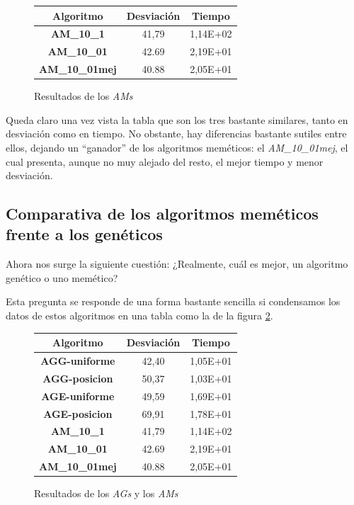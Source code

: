 \begin{figure}[H]
    \centering
    \begin{tabular}{|c|c|c|}
        \hline
        Algoritmo & \textbf{Desviación} & \textbf{Tiempo}\\
        \hline
        \textbf{AM\_10\_1} & 41,79 & 1,14E+02\\
        \hline
        \textbf{AM\_10\_01} & 42.69 & 2,19E+01\\
        \hline
        \textbf{AM\_10\_01mej} & 40.88 & 2,05E+01\\
        \hline
    \end{tabular}
    \caption{Resultados de los \textit{AMs}}
    \label{fig:tablamem}
\end{figure}

Queda claro una vez vista la tabla que son los tres bastante similares, tanto en desviación como en tiempo.
No obstante, hay diferencias bastante sutiles entre ellos, dejando un ``ganador'' de los algoritmos meméticos: el \textit{AM\_10\_01mej}, el cual presenta, aunque no muy alejado del resto, el mejor tiempo y menor desviación.

\subsection{Comparativa de los algoritmos meméticos frente a los genéticos}

Ahora nos surge la siguiente cuestión: ¿Realmente, cuál es mejor, un algoritmo genético o uno memético?

Esta pregunta se responde de una forma bastante sencilla si condensamos los datos de estos algoritmos en una tabla como la de la figura \ref{fig:memvsgen}.

\begin{figure}[H]
    \centering
    \begin{tabular}{|c|c|c|}
        \hline
        Algoritmo & \textbf{Desviación} & \textbf{Tiempo}\\
        \hline
        \textbf{AGG-uniforme} & 42,40 & 1,05E+01\\
        \hline
        \textbf{AGG-posicion} & 50,37 & 1,03E+01\\
        \hline
        \textbf{AGE-uniforme} & 49,59 & 1,69E+01\\
        \hline
        \textbf{AGE-posicion} & 69,91 & 1,78E+01\\
        \hline
        \textbf{AM\_10\_1} & 41,79 & 1,14E+02\\
        \hline
        \textbf{AM\_10\_01} & 42.69 & 2,19E+01\\
        \hline
        \textbf{AM\_10\_01mej} & 40.88 & 2,05E+01\\
        \hline
    \end{tabular}
    \caption{Resultados de los \textit{AGs} y los \textit{AMs}}
    \label{fig:memvsgen}
\end{figure}

